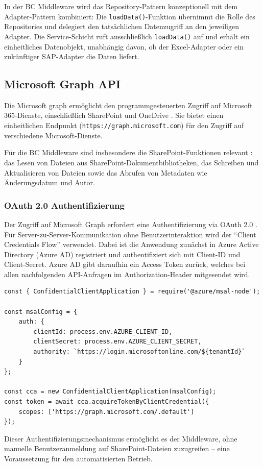 In der BC Middleware wird das Repository-Pattern konzeptionell mit dem Adapter-Pattern kombiniert: Die \texttt{loadData()}-Funktion übernimmt die Rolle des Repositories und delegiert den tatsächlichen Datenzugriff an den jeweiligen Adapter. Die Service-Schicht ruft ausschließlich \texttt{loadData()} auf und erhält ein einheitliches Datenobjekt, unabhängig davon, ob der Excel-Adapter oder ein zukünftiger SAP-Adapter die Daten liefert.

\subsection{Microsoft Graph API}

Die Microsoft \gls{graph} ermöglicht den programmgesteuerten Zugriff auf Microsoft 365-Dienste, einschließlich SharePoint und OneDrive \citep{microsoft2024graph}. Sie bietet einen einheitlichen Endpunkt (\texttt{https://graph.microsoft.com}) für den Zugriff auf verschiedene Microsoft-Dienste.

Für die BC Middleware sind insbesondere die SharePoint-Funktionen relevant \citep{microsoft2024sharepoint}: das Lesen von Dateien aus SharePoint-Dokumentbibliotheken, das Schreiben und Aktualisieren von Dateien sowie das Abrufen von Metadaten wie Änderungsdatum und Autor.

\subsubsection{OAuth 2.0 Authentifizierung}

Der Zugriff auf Microsoft Graph erfordert eine Authentifizierung via OAuth 2.0 \citep{microsoft2024oauth}. Für Server-zu-Server-Kommunikation ohne Benutzerinteraktion wird der \enquote{Client Credentials Flow} verwendet. Dabei ist die Anwendung zunächst in Azure Active Directory (Azure AD) registriert und authentifiziert sich mit Client-ID und Client-Secret. Azure AD gibt daraufhin ein Access Token zurück, welches bei allen nachfolgenden API-Anfragen im Authorization-Header mitgesendet wird.

\begin{lstlisting}[caption={Authentifizierung mit Microsoft Graph}, label={lst:ms-auth}]
const { ConfidentialClientApplication } = require('@azure/msal-node');

const msalConfig = {
    auth: {
        clientId: process.env.AZURE_CLIENT_ID,
        clientSecret: process.env.AZURE_CLIENT_SECRET,
        authority: `https://login.microsoftonline.com/${tenantId}`
    }
};

const cca = new ConfidentialClientApplication(msalConfig);
const token = await cca.acquireTokenByClientCredential({
    scopes: ['https://graph.microsoft.com/.default']
});
\end{lstlisting}

Dieser Authentifizierungsmechanismus ermöglicht es der Middleware, ohne manuelle Benutzeranmeldung auf SharePoint-Dateien zuzugreifen -- eine Voraussetzung für den automatisierten Betrieb.
